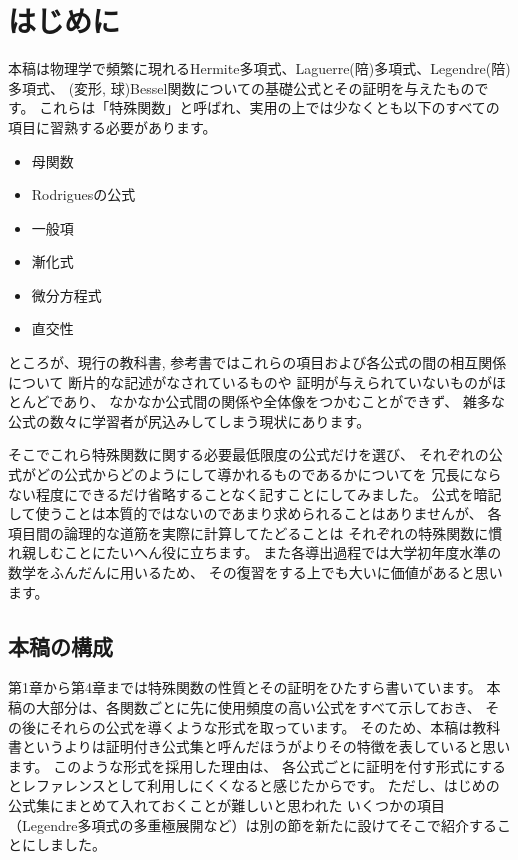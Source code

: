 \documentclass[../main/main]{subfiles}
\begin{document}
\small

\chapter*{はじめに}

本稿は物理学で頻繁に現れるHermite多項式、Laguerre(陪)多項式、Legendre(陪)多項式、
(変形, 球)Bessel関数についての基礎公式とその証明を与えたものです。
これらは「特殊関数」と呼ばれ、実用の上では少なくとも以下のすべての項目に習熟する必要があります。\vspace{3pt}
\begin{itemize}
  \item 母関数
  \item Rodriguesの公式
  \item 一般項
  \item 漸化式
  \item 微分方程式
  \item 直交性
\end{itemize}\vspace{3pt}
ところが、現行の教科書, 参考書ではこれらの項目および各公式の間の相互関係について
断片的な記述がなされているものや
証明が与えられていないものがほとんどであり、
なかなか公式間の関係や全体像をつかむことができず、
雑多な公式の数々に学習者が尻込みしてしまう現状にあります。

そこでこれら特殊関数に関する必要最低限度の公式だけを選び、
それぞれの公式がどの公式からどのようにして導かれるものであるかについてを
冗長にならない程度にできるだけ省略することなく記すことにしてみました。
公式を暗記して使うことは本質的ではないのであまり求められることはありませんが、
各項目間の論理的な道筋を実際に計算してたどることは
それぞれの特殊関数に慣れ親しむことにたいへん役に立ちます。
また各導出過程では大学初年度水準の数学をふんだんに用いるため、
その復習をする上でも大いに価値があると思います。

\section*{本稿の構成}
第1章から第4章までは特殊関数の性質とその証明をひたすら書いています。
本稿の大部分は、各関数ごとに先に使用頻度の高い公式をすべて示しておき、
その後にそれらの公式を導くような形式を取っています。
そのため、本稿は教科書というよりは証明付き公式集と呼んだほうがよりその特徴を表していると思います。
このような形式を採用した理由は、
各公式ごとに証明を付す形式にするとレファレンスとして利用しにくくなると感じたからです。
ただし、はじめの公式集にまとめて入れておくことが難しいと思われた
いくつかの項目（Legendre多項式の多重極展開など）は別の節を新たに設けてそこで紹介することにしました。
\end{document}

